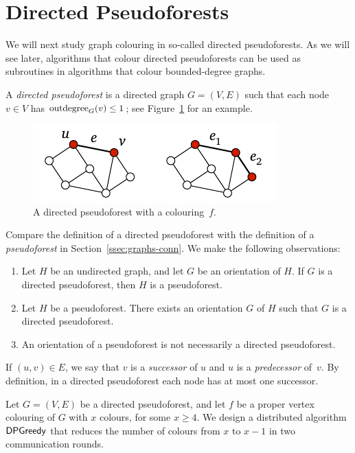 \section{Directed Pseudoforests}

We will next study graph colouring in so-called directed pseudoforests. As we will see later, algorithms that colour directed pseudoforests can be used as subroutines in algorithms that colour bounded-degree graphs.

A \emph{directed pseudoforest} is a directed graph $G = (V,E)$ such that each node $v \in V$ has $\operatorname{outdegree}_G(v) \le 1$; see Figure~\ref{fig:dp} for an example.

\begin{figure}
    \centering
    \includegraphics[page=\PDP]{figs.pdf}
    \caption{A directed pseudoforest with a colouring~$f$.}\label{fig:dp}
\end{figure}

Compare the definition of a directed pseudoforest with the definition of a \emph{pseudoforest} in Section~\ref{ssec:graphs-conn}. We make the following observations:
\begin{enumerate}
    \item Let $H$ be an undirected graph, and let $G$ be an orientation of $H$. If $G$ is a directed pseudoforest, then $H$ is a pseudoforest.
    \item Let $H$ be a pseudoforest. There exists an orientation $G$ of $H$ such that $G$ is a directed pseudoforest.
    \item An orientation of a pseudoforest is not necessarily a directed pseudoforest.
\end{enumerate}
If $(u,v) \in E$, we say that $v$ is a \emph{successor} of $u$ and $u$ is a \emph{predecessor} of~$v$. By definition, in a directed pseudoforest each node has at most one successor.


\label{sec:dpgreedy}

Let $G = (V,E)$ be a directed pseudoforest, and let $f$ be a proper vertex colouring of $G$ with $x$ colours, for some $x \ge 4$. We design a distributed algorithm $\textup{\sffamily DPGreedy}$ that reduces the number of colours from $x$ to $x-1$ in two communication rounds.

